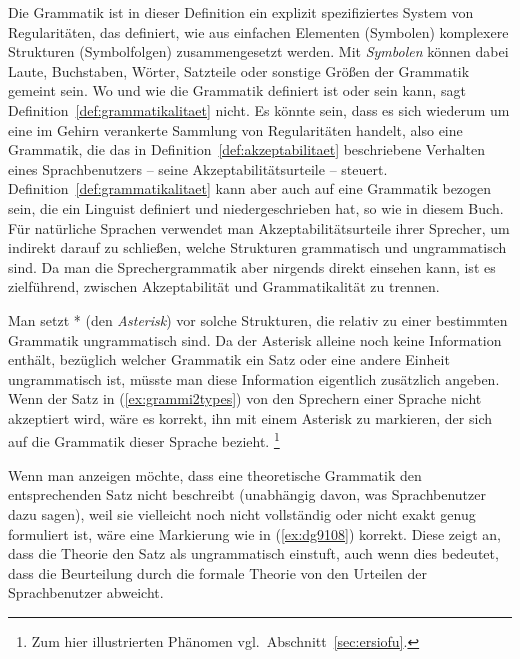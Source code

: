 
Die Grammatik ist in dieser Definition ein explizit spezifiziertes System von Regularitäten, das definiert, wie aus einfachen Elementen (Symbolen) komplexere Strukturen (Symbolfolgen) zusammengesetzt werden.
Mit \textit{Symbolen} können dabei Laute, Buchstaben, Wörter, Satzteile oder sonstige Größen der Grammatik gemeint sein.
Wo und wie die Grammatik definiert ist oder sein kann, sagt Definition~\ref{def:grammatikalitaet} nicht.
Es könnte sein, dass es sich wiederum um eine im Gehirn verankerte Sammlung von Regularitäten handelt, also eine Grammatik, die das in Definition~\ref{def:akzeptabilitaet} beschriebene Verhalten eines Sprachbenutzers -- seine Akzeptabilitätsurteile -- steuert.
Definition~\ref{def:grammatikalitaet} kann aber auch auf eine Grammatik bezogen sein, die ein Linguist definiert und niedergeschrieben hat, so wie in diesem Buch.
Für natürliche Sprachen verwendet man Akzeptabilitätsurteile ihrer Sprecher, um indirekt darauf zu schließen, welche Strukturen grammatisch und ungrammatisch sind.
Da man die Sprechergrammatik aber nirgends direkt einsehen kann, ist es zielführend, zwischen Akzeptabilität und Grammatikalität zu trennen.

Man setzt * (den \textit{Asterisk}) vor solche Strukturen, die relativ zu einer bestimmten Grammatik ungrammatisch sind.
Da der Asterisk alleine noch keine Information enthält, bezüglich welcher Grammatik ein Satz oder eine andere Einheit ungrammatisch ist, müsste man diese Information eigentlich zusätzlich angeben.
Wenn der Satz in (\ref{ex:grammi2types}) von den Sprechern einer Sprache nicht akzeptiert wird, wäre es korrekt, ihn mit einem Asterisk zu markieren, der sich auf die Grammatik dieser Sprache bezieht.%
\footnote{Zum hier illustrierten Phänomen vgl.\ Abschnitt~\ref{sec:ersiofu}.}

\begin{exe}
\end{exe}

Wenn man anzeigen möchte, dass eine theoretische Grammatik den entsprechenden Satz nicht beschreibt (unabhängig davon, was Sprachbenutzer dazu sagen), weil sie vielleicht noch nicht vollständig oder nicht exakt genug formuliert ist, wäre eine Markierung wie in (\ref{ex:dg9108}) korrekt.
Diese zeigt an, dass die Theorie den Satz als ungrammatisch einstuft, auch wenn dies bedeutet, dass die Beurteilung durch die formale Theorie von den Urteilen der Sprachbenutzer abweicht.
\begin{exe}
\end{exe}

